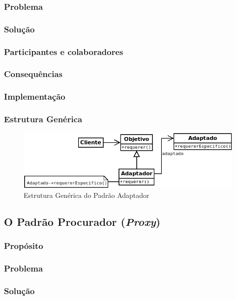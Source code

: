 \subsubsection{Problema}
\subsubsection{Solução}
\subsubsection{Participantes e colaboradores}
\subsubsection{Consequências}
\subsubsection{Implementação}
\subsubsection{Estrutura Genérica}

\begin{figure}[h]
\begin{center}
\includegraphics[scale=0.6]{adaptador.png}
\caption{Estrutura Genérica do Padrão Adaptador}\label{fig:adaptador}
\end{center}
\end{figure}

\subsection{O Padrão Procurador (\textit{Proxy})}
\subsubsection{Propósito}
\subsubsection{Problema}
\subsubsection{Solução}
